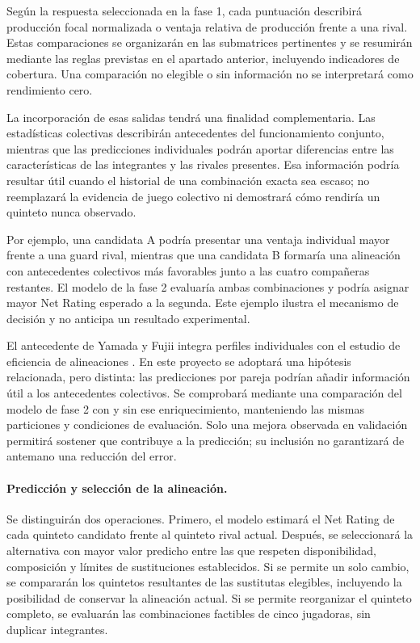 Según la respuesta seleccionada en la fase 1, cada puntuación describirá producción focal normalizada o ventaja relativa de producción frente a una rival. Estas comparaciones se organizarán en las submatrices pertinentes y se resumirán mediante las reglas previstas en el apartado anterior, incluyendo indicadores de cobertura. Una comparación no elegible o sin información no se interpretará como rendimiento cero.

La incorporación de esas salidas tendrá una finalidad complementaria. Las estadísticas colectivas describirán antecedentes del funcionamiento conjunto, mientras que las predicciones individuales podrán aportar diferencias entre las características de las integrantes y las rivales presentes. Esa información podría resultar útil cuando el historial de una combinación exacta sea escaso; no reemplazará la evidencia de juego colectivo ni demostrará cómo rendiría un quinteto nunca observado.

Por ejemplo, una candidata A podría presentar una ventaja individual mayor frente a una guard rival, mientras que una candidata B formaría una alineación con antecedentes colectivos más favorables junto a las cuatro compañeras restantes. El modelo de la fase 2 evaluaría ambas combinaciones y podría asignar mayor Net Rating esperado a la segunda. Este ejemplo ilustra el mecanismo de decisión y no anticipa un resultado experimental.

El antecedente de Yamada y Fujii integra perfiles individuales con el estudio de eficiencia de alineaciones \cite{yamada2024offensivelineupanalysisbasketball}. En este proyecto se adoptará una hipótesis relacionada, pero distinta: las predicciones por pareja podrían añadir información útil a los antecedentes colectivos. Se comprobará mediante una comparación del modelo de fase 2 con y sin ese enriquecimiento, manteniendo las mismas particiones y condiciones de evaluación. Solo una mejora observada en validación permitirá sostener que contribuye a la predicción; su inclusión no garantizará de antemano una reducción del error.

\paragraph*{Predicción y selección de la alineación.}
Se distinguirán dos operaciones. Primero, el modelo estimará el Net Rating de cada quinteto candidato frente al quinteto rival actual. Después, se seleccionará la alternativa con mayor valor predicho entre las que respeten disponibilidad, composición y límites de sustituciones establecidos. Si se permite un solo cambio, se compararán los quintetos resultantes de las sustitutas elegibles, incluyendo la posibilidad de conservar la alineación actual. Si se permite reorganizar el quinteto completo, se evaluarán las combinaciones factibles de cinco jugadoras, sin duplicar integrantes.

